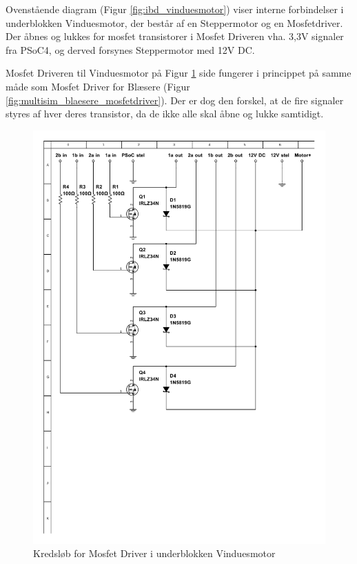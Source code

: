 Ovenstående diagram (Figur \ref{fig:ibd_vinduesmotor}) viser interne forbindelser i underblokken Vinduesmotor, der består af en Steppermotor og en Mosfetdriver. 
Der åbnes og lukkes for mosfet transistorer i Mosfet Driveren vha. 3,3V signaler fra PSoC4, og derved forsynes Steppermotor med 12V DC. 

\mbox{}

Mosfet Driveren til Vinduesmotor på Figur \ref{fig:multisim_vinduesmotor_mosfetdriver} side \pageref{fig:multisim_vinduesmotor_mosfetdriver} fungerer i princippet på samme måde som Mosfet Driver for Blæsere (Figur \ref{fig:multisim_blaesere_mosfetdriver}).
Der er dog den forskel, at de fire signaler styres af hver deres transistor, da de ikke alle skal åbne og lukke samtidigt. 

\clearpage

\begin{figure}[h]
\centering 
\includegraphics[width={\textwidth}, trim= 40 260 0 40, clip=true] {../fig/multisim_vinduesmotor_mosfetdriver.pdf}
\caption{Kredsløb for Mosfet Driver i underblokken Vinduesmotor}
\label{fig:multisim_vinduesmotor_mosfetdriver}
\end{figure}

